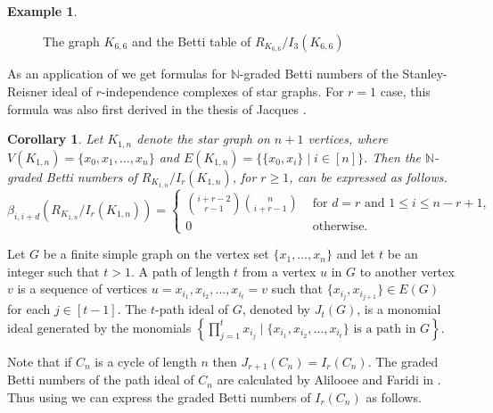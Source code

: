 \documentclass[12pt,reqno]{amsart}
\newtheorem{corollary}[proposition]{Corollary}
\theoremstyle{definition}
\newtheorem{example}[proposition]{Example}
\begin{document}
\begin{example}
\begin{figure}[h!]
\caption{ The graph $K_{6,6}$ and the Betti table of $R_{K_{6,6}}/I_3(K_{6,6})$}
\end{figure}
\end{example}

As an application of  we get formulas for $\mathbb N$-graded Betti numbers of the Stanley-Reisner ideal of $r$-independence complexes of star graphs.  For $r=1$ case, this formula was also first derived in the thesis of Jacques \cite[Theorem 5.4.11]{SJ}.  

\begin{corollary}\label{star graph case}
    Let $K_{1,n}$ denote the star graph on $n+1$ vertices, where $V(K_{1,n})=\{x_0,x_1,\dots, x_n\}$ and $E(K_{1,n})=\{\{x_0,x_i\}\mid i\in [n]\}$. Then the $\mathbb N$-graded Betti numbers of $R_{K_{1,n}}/I_{r}(K_{1,n})$, for $r\ge 1$, can be expressed as follows.
    \[
    \beta_{i,i+d}(R_{K_{1,n}}/I_r(K_{1,n}))=\begin{cases}
        {i+r-2\choose r-1}{n\choose i+r-1} &\text{ for } d=r \text{ and }1\le i\le n-r+1,\\
        0 &\text{ otherwise. }
    \end{cases}
    \]
\end{corollary}

Let $G$ be a finite simple graph on the vertex set $\{x_1,\ldots,x_n\}$ and let $t$ be an integer such that $t>1$. A path of length $t$ from a vertex $u$ in $G$ to another vertex $v$ is a sequence of vertices $u=x_{i_1},x_{i_2},\ldots,x_{i_t}=v$ such that $\{x_{i_j},x_{i_{j+1}}\}\in E(G)$ for each $j\in [t-1]$. The $t$-path ideal of $G$, denoted by $J_t(G)$, is a monomial ideal generated by the monomials $\left\{\prod_{j=1}^tx_{i_j}\mid \{x_{i_1},x_{i_2},\ldots,x_{i_t}\} \text{ is a path in }G \right\}$.

Note that if $C_n$ is a cycle of length $n$ then $J_{r+1}(C_n)=I_r(C_n)$. The graded Betti numbers of the path ideal of $C_n$ are calculated by Alilooee and Faridi in \cite{AlFa}. Thus using \cite[Theorem 4.13]{AlFa} we can express the graded Betti numbers of $I_r(C_n)$ as follows.
\end{document}
